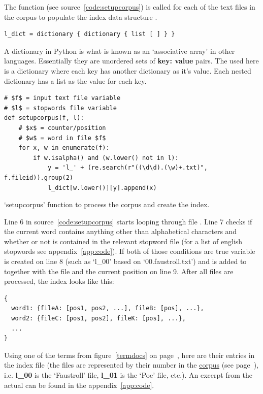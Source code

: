 The  function (see source~\ref{code:setupcorpus}) is called for each of the text files in the corpus to populate the index data structure .

\begin{verbatim}
l_dict = dictionary { dictionary { list [ ] } }
\end{verbatim}

A dictionary in Python is what is known as an `associative array' in other languages. Essentially they are unordered sets of \textbf{key: value} pairs. The  used here is a dictionary where each key has another dictionary as it's value. Each nested dictionary has a list as the value for each key.

\begin{listing}
  \begin{verbatim}
# $f$ = input text file variable
# $l$ = stopwords file variable
def setupcorpus(f, l):
    # $x$ = counter/position
    # $w$ = word in file $f$
    for x, w in enumerate(f):
        if w.isalpha() and (w.lower() not in l):
            y = 'l_' + (re.search(r"((\d\d).(\w)+.txt)", f.fileid)).group(2)
            l_dict[w.lower()][y].append(x)
  \end{verbatim}
\caption{`setupcorpus' function to process the corpus and create the index.}
\label{code:setupcorpus}
\end{listing}

Line \num{6} in source~\ref{code:setupcorpus} starts looping through file . Line \num{7} checks if the current word  contains anything other than alphabetical characters and whether or not  is contained in the relevant stopword file  (for a list of english stopwords see appendix~\ref{app:code}). If both of those conditions are true variable  is created on line \num{8} (such as `l\_00' based on `00.faustroll.txt') and  is added to  together with the file  and the current position  on line 9. After all files are processed, the index looks like this:

\begin{verbatim}
{
  word1: {fileA: [pos1, pos2, ...], fileB: [pos], ...},
  word2: {fileC: [pos1, pos2], fileK: [pos], ...},
  ...
}
\end{verbatim}

Using one of the terms from figure~\ref{termdocs} on page~\pageref{termdocs}, here are their entries in the index file (the files are represented by their number in the \hyperlink{corpus}{corpus} (see page~\pageref{ref:corpus}), i.e. \textbf{l\_00} is the `Faustroll' file, \textbf{l\_01} is the `Poe' file, etc.). An excerpt from the actual  can be found in the appendix~\ref{app:code}.

